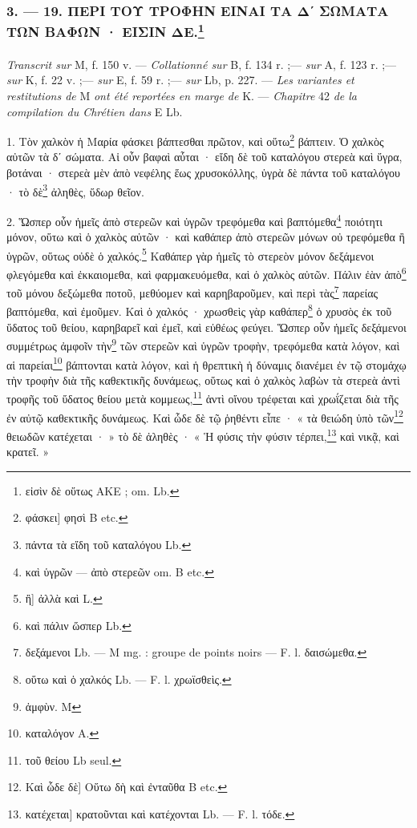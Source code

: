 \documentclass[landscape, a4paper, 11pt, oneside, polutonikogreek, french]{article}
\begin{document}
\subsubsection[3. --- 19. ΠΕΡΙ ΤΟΥ ΤΡΟΦΗΝ ΕΙΝΑΙ ΤΑ Δʹ ΣΩΜΑΤΑ ΤΩΝ ΒΑΦΩΝ · ΕΙΣΙΝ ΔΕ.]{3. --- 19. ΠΕΡΙ ΤΟΥ ΤΡΟΦΗΝ ΕΙΝΑΙ ΤΑ Δʹ ΣΩΜΑΤΑ ΤΩΝ ΒΑΦΩΝ · ΕΙΣΙΝ ΔΕ.\footnote{εἰσὶν δὲ οὕτως AKE ; om. Lb.}}
\paragraph{}
\emph{Transcrit sur} M, f. 150 v. --- \emph{Collationné sur} B, f. 134 r. ;--- \emph{sur} A, f. 123 r. ;--- \emph{sur} K, f. 22 v. ;--- \emph{sur} E, f. 59 r. ;--- \emph{sur} Lb, p. 227. --- \emph{Les variantes et restitutions de} M \emph{ont été reportées en marge de} K. --- \emph{Chapitre} 42 \emph{de la compilation du Chrétien dans} E Lb.

\bigskip

1. Τὸν χαλκὸν ἡ Μαρία φάσκει βάπτεσθαι πρῶτον, καὶ οὕτω\footnote{φάσκει] φησὶ B etc.} βάπτειν. Ὁ χαλκὸς αὐτῶν τὰ δʹ σώματα. Αἱ οὖν βαφαὶ αὗται · εἴδη δὲ τοῦ καταλόγου στερεὰ καὶ ὕγρα, βοτάναι · στερεὰ μὲν ἀπὸ νεφέλης ἕως χρυσοκόλλης, ὑγρὰ δὲ πάντα τοῦ καταλόγου · τὸ δὲ\footnote{πάντα τὰ εἴδη τοῦ καταλόγου Lb.} ἀληθὲς, ὕδωρ θεῖον.

2. Ὥσπερ οὖν ἡμεῖς ἀπὸ στερεῶν καὶ ὑγρῶν τρεφόμεθα καὶ βαπτόμεθα\footnote{καὶ ὑγρῶν --- ἀπὸ στερεῶν om. B etc.} ποιότητι μόνον, οὕτω καὶ ὁ χαλκὸς αὐτῶν · καὶ καθάπερ ἀπὸ στερεῶν μόνων οὐ τρεφόμεθα ἢ ὑγρῶν, οὕτως οὐδὲ ὁ χαλκός.\footnote{ἢ] ἀλλὰ καὶ L.} Καθάπερ γὰρ ἡμεῖς τὸ στερεὸν μόνον δεξάμενοι φλεγόμεθα καὶ ἐκκαιομεθα, καὶ φαρμακευόμεθα, καὶ ὁ χαλκὸς αὐτῶν. Πάλιν ἐὰν ἀπὸ\footnote{καὶ πάλιν ὥσπερ Lb.} τοῦ μόνου δεξώμεθα ποτοῦ, μεθύομεν καὶ καρηβαροῦμεν, καὶ περὶ τὰς\footnote{δεξάμενοι Lb. --- M mg. : groupe de points noirs --- F. l. δαισώμεθα.} παρείας βαπτόμεθα, καὶ ἐμοῦμεν. Καὶ ὁ χαλκός · χρωσθεὶς γὰρ καθάπερ\footnote{οὕτω καὶ ὁ χαλκός Lb. --- F. l. χρωϊσθεὶς.} ὁ χρυσὸς ἐκ τοῦ ὕδατος τοῦ θείου, καρηβαρεῖ καὶ ἐμεῖ, καὶ εὐθέως φεύγει. Ὥσπερ οὖν ἡμεῖς δεξάμενοι συμμέτρως ἀμφοῖν τὴν\footnote{ἀμφὺν. M} τῶν στερεῶν καὶ ὑγρῶν τροφὴν, τρεφόμεθα κατὰ λόγον, καὶ αἱ παρείαι\footnote{καταλόγον A.} βάπτονται κατὰ λόγον, καὶ ἡ θρεπτικὴ ἡ δύναμις διανέμει ἐν τῷ στομάχῳ τὴν τροφὴν διὰ τῆς καθεκτικῆς δυνάμεως, οὕτως καὶ ὁ χαλκὸς λαβὼν τὰ στερεὰ ἀντὶ τροφῆς τοῦ ὕδατος θείου μετὰ κομμεως,\footnote{τοῦ θείου Lb seul.} ἀντὶ οἴνου τρέφεται καὶ χρωΐζεται διὰ τῆς ἐν αὐτῷ καθεκτικῆς δυνάμεως. Καὶ ὧδε δὲ τῷ ῥηθέντι εἶπε · « τὰ θειώδη ὑπὸ τῶν\footnote{Καὶ ὧδε δὲ] Οὕτω δὴ καὶ ἐνταῦθα B etc.} θειωδῶν κατέχεται · » τὸ δὲ ἀληθὲς · « Ἡ φύσις τὴν φύσιν τέρπει,\footnote{κατέχεται] κρατοῦνται καὶ κατέχονται Lb. --- F. l. τόδε.} καὶ νικᾷ, καὶ κρατεῖ. »
\end{document}

